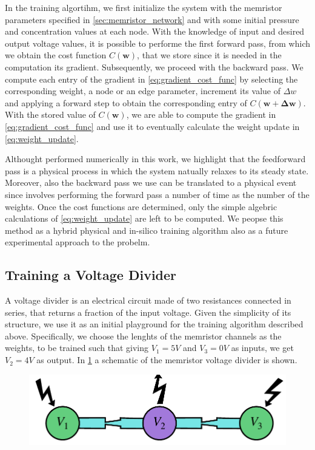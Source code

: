 \documentclass[reprint,superscriptaddress,prb,showkeys]{revtex4-2}
\newcommand{\brac}[1]{\left(#1 \right)} %
\begin{document}
In the training algortihm, we first initialize the system with the memristor parameters specified in \cref{sec:memristor_network} and with some initial pressure and concentration values at each node. With the knowledge of input and desired output voltage values, it is possible to performe the first forward pass, from which we obtain the cost function $C\brac{\boldsymbol{w}}$, that we store since it is needed in the computation its gradient. Subsequently, we proceed with the backward pass. We compute each entry of the gradient in \cref{eq:gradient_cost_func} by selecting the corresponding weight, a node or an edge parameter, increment its value of $\Delta w$ and applying a forward step to obtain the corresponding entry of $C\brac{\boldsymbol{w}+\boldsymbol{\Delta w}}$. With the stored value of $C\brac{\boldsymbol{w}}$, we are able to compute the gradient in \cref{eq:gradient_cost_func} and use it to eventually calculate the weight update in \cref{eq:weight_update}.

Althought performed numerically in this work, we highlight that the feedforward pass is a physical process in which the system natually relaxes to its steady state. Moreover, also the backward pass we use can be translated to a physical event since involves performing the forward pass a number of time as the number of the weights. Once the cost functions are determined, only the simple algebric calculations of \cref{eq:weight_update} are left to be computed. We peopse this method as a hybrid physical and in-silico training algorithm also as a future experimental approach to the probelm.

\subsection{Training a Voltage Divider}

A voltage divider is an electrical circuit made of two resistances connected in series, that returns a fraction of the input voltage. Given the simplicity of its structure, we use it as an initial playground for the training algorithm described above. Specifically, we choose the lenghts of the memristor channels as the weights, to be trained such that giving $V_1 = 5V$ and $V_3 = 0V$ as inputs, we get $V_2 = 4V$ as output. In \cref{fig:vd_scheme} a schematic of the memristor voltage divider is shown.

\begin{figure}[h]
    \centering
    \includegraphics[width=0.8\columnwidth]{plots/voltage_divider/vd_scheme.pdf}
    \caption{}\label{fig:vd_scheme}
\end{figure} 
\end{document}
